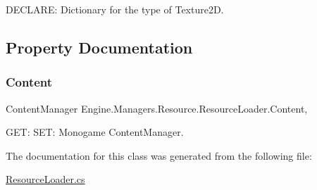D\+E\+C\+L\+A\+RE\+: Dictionary for the type of Texture2D. 



\subsection{Property Documentation}
\mbox{\label{a00530_a4d635d8ea6e09eb1e403da947ac92bc2}} 
\subsubsection{\texorpdfstring{Content}{Content}}
{\footnotesize\ttfamily Content\+Manager Engine.\+Managers.\+Resource.\+Resource\+Loader.\+Content\hspace{0.3cm}{\ttfamily [get]}, {\ttfamily [set]}}



G\+ET\+: S\+ET\+: Monogame Content\+Manager. 



The documentation for this class was generated from the following file\+:\begin{DoxyCompactItemize}
\item 
\hyperlink{a00179}{Resource\+Loader.\+cs}\end{DoxyCompactItemize}
